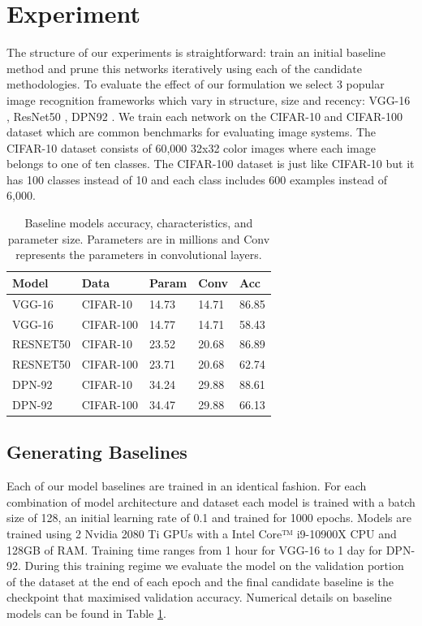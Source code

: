 \documentclass[11pt]{article}
\begin{document}
\section{Experiment}
The structure of our experiments is straightforward: train an initial baseline method and prune this networks iteratively using each of the candidate methodologies. To evaluate the effect of our formulation we select 3 popular image recognition frameworks which vary in structure, size and recency: VGG-16 \cite{Simonyan2015VeryDC}, ResNet50 \cite{He2016DeepRL}, DPN92 \cite{Chen2017DualPN}. We train each network on the CIFAR-10 \cite{Krizhevsky2009LearningML} and CIFAR-100 \cite{CIFAR-10} dataset which are common benchmarks for evaluating image systems. The CIFAR-10 dataset consists of 60,000 32x32 color images where each image belongs to one of ten classes. The CIFAR-100 dataset is just like CIFAR-10 but it has 100 classes instead of 10 and each class includes 600 examples instead of 6,000. \\
\begin{tiny}
\begin{table}[h]
\begin{tabular}{|l|l|l|l|l|}
\hline
Model& Data   & Param & Conv& Acc\\ \hline
VGG-16       & CIFAR-10  & 14.73             & 14.71   & 86.85                 \\ \hline
VGG-16       & CIFAR-100 & 14.77           & 14.71     & 58.43                 \\ \hline
RESNET50     & CIFAR-10  & 23.52  & 20.68              & 86.89              \\  \hline
RESNET50     & CIFAR-100 & 23.71 & 20.68               & 62.74               \\\hline
DPN-92       & CIFAR-10  & 34.24         & 29.88       & 88.61                 \\\hline
DPN-92       & CIFAR-100 & 34.47            & 29.88    & 66.13  \\  \hline             
\end{tabular}
\caption{Baseline models accuracy, characteristics, and parameter size. Parameters are in millions and Conv represents the parameters in convolutional layers. }
\label{tab:tab1}
\end{table}
\end{tiny}
\subsection{Generating Baselines}
Each of our model baselines are trained in an identical fashion. For each combination of model architecture and dataset each model is trained with a batch size of 128, an initial learning rate of 0.1 and trained for 1000 epochs. Models are trained using 2 Nvidia 2080 Ti GPUs with a  Intel Core™ i9-10900X CPU and 128GB of RAM. Training time ranges from 1 hour for VGG-16 to 1 day for DPN-92. During this training regime we evaluate the model on the validation portion of the dataset at the end of each epoch and the final candidate baseline is the checkpoint that maximised validation accuracy. Numerical details on baseline models can be found in Table \ref{tab:tab1}.
\end{document}

